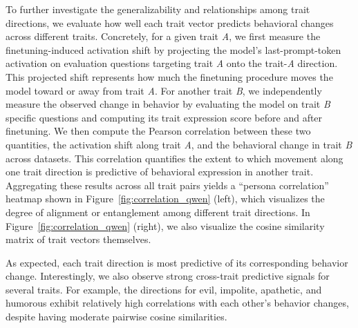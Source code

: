 
To further investigate the generalizability and relationships among trait directions, we evaluate how well each trait vector predicts behavioral changes across different traits. Concretely, for a given trait \textit{A}, we first measure the finetuning-induced activation shift by projecting the model’s last-prompt-token activation on evaluation questions targeting trait \textit{A} onto the trait-\textit{A} direction. This projected shift represents how much the finetuning procedure moves the model toward or away from trait \textit{A}. For another trait \textit{B}, we independently measure the observed change in behavior by evaluating the model on trait \textit{B} specific questions and computing its trait expression score before and after finetuning. We then compute the Pearson correlation between these two quantities, the activation shift along  trait \textit{A}, and the behavioral change in trait  \textit{B} across datasets. This correlation quantifies the extent to which movement along one trait direction is predictive of behavioral expression in another trait. Aggregating these results across all trait pairs yields a “persona correlation” heatmap shown in Figure~\ref{fig:correlation_qwen} (left), which visualizes the degree of alignment or entanglement among different trait directions. In Figure~\ref{fig:correlation_qwen} (right), we also visualize the cosine similarity matrix of trait vectors themselves.

As expected, each trait direction is most predictive of its corresponding behavior change. Interestingly, we also observe strong cross-trait predictive signals for several traits. For example, the directions for evil, impolite, apathetic, and humorous exhibit relatively high correlations with each other’s behavior changes, despite having moderate pairwise cosine similarities. 

